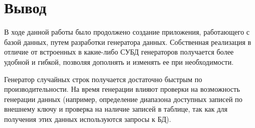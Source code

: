 \section{Вывод}
В ходе данной работы было продолжено создание приложения, работающего с базой
данных, путем разработки генератора данных. Собственная реализация в отличие от встроенных в какие-либо СУБД генераторов получается более удобной и гибкой, позволяя дополнять и изменять ее при необходимости.

Генератор случайных строк получается достаточно быстрым по производительности. На время генерации влияют проверки на возможность генерации данных (например, определение диапазона доступных записей по внешнему ключу и проверка на наличие записей в таблице, так как для получения этих данных используются запросы к БД).